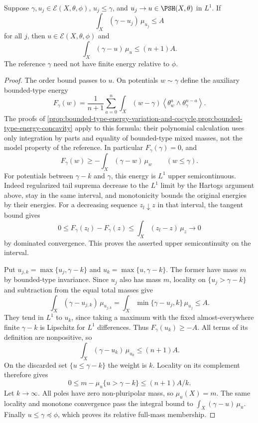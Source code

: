 \begin{lemma}\label{lem:relative-self-integral-lone-stability}
Suppose $\gamma,u_j\in\mathcal E(X,\theta,\phi)$, $u_j\leq\gamma$, and $u_j\to u\in\PSH(X,\theta)$ in $L^1$. If
\[
 \int_X(\gamma-u_j)\,\mu_{u_j}\leq A
\]
for all $j$, then $u\in\mathcal E(X,\theta,\phi)$ and
\[
 \int_X(\gamma-u)\,\mu_u\leq(n+1)A.
\]
The reference $\gamma$ need not have finite energy relative to $\phi$.
\end{lemma}
\begin{proof}
The order bound passes to $u$. On potentials $w\sim\gamma$ define the auxiliary bounded-type energy
\[
 F_\gamma(w)=\frac1{n+1}\sum_{a=0}^n
       \int_X(w-\gamma)
           \left\langle\theta_w^a\wedge\theta_\gamma^{n-a}\right\rangle.
\]
The proofs of \cref{prop:bounded-type-energy-variation-and-cocycle,prop:bounded-type-energy-concavity} apply to this formula: their polynomial calculation uses only integration by parts and equality of bounded-type mixed masses, not the model property of the reference. In particular $F_\gamma(\gamma)=0$, and
\[
 F_\gamma(w)\geq-\int_X(\gamma-w)\,\mu_w
                       \qquad(w\leq\gamma).
\]
For potentials between $\gamma-k$ and $\gamma$, this energy is $L^1$ upper semicontinuous. Indeed regularized tail suprema decrease to the $L^1$ limit by the Hartogs argument above, stay in the same interval, and monotonicity bounds the original energies by their energies. For a decreasing sequence $z_l\downarrow z$ in that interval, the tangent bound gives
\[
 0\leq F_\gamma(z_l)-F_\gamma(z)
                       \leq\int_X(z_l-z)\,\mu_z\longrightarrow0
\]
by dominated convergence. This proves the asserted upper semicontinuity on the interval.

Put $u_{j,k}=\max\{u_j,\gamma-k\}$ and $u_k=\max\{u,\gamma-k\}$. The former have mass $m$ by bounded-type invariance. Since $u_j$ also has mass $m$, locality on $\{u_j>\gamma-k\}$ and subtraction from the equal total masses give
\[
 \int_X(\gamma-u_{j,k})\,\mu_{u_{j,k}}
       =\int_X\min\{\gamma-u_j,k\}\,\mu_{u_j}\leq A.
\]
They tend in $L^1$ to $u_k$, since taking a maximum with the fixed almost-everywhere finite $\gamma-k$ is Lipschitz for $L^1$ differences. Thus $F_\gamma(u_k)\geq-A$. All terms of its definition are nonpositive, so
\[
 \int_X(\gamma-u_k)\,\mu_{u_k}\leq(n+1)A.
\]
On the discarded set $\{u\leq\gamma-k\}$ the weight is $k$. Locality on its complement therefore gives
\[
 0\leq m-\mu_u\{u>\gamma-k\}\leq(n+1)A/k.
\]
Let $k\to\infty$. All poles have zero non-pluripolar mass, so $\mu_u(X)=m$. The same locality and monotone convergence pass the integral bound to $\int_X(\gamma-u)\,\mu_u$. Finally $u\leq\gamma\preceq\phi$, which proves its relative full-mass membership.
\end{proof}


